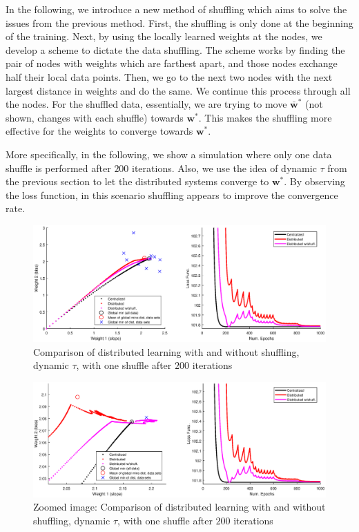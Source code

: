 \documentclass[11pt, fullpage,letterpaper]{article}
\begin{document}
\begin{enumerate}
\begin{enumerate}
   In the following, we introduce a new method of shuffling which aims to solve the issues from the previous method. First, the shuffling is only done at the beginning of the training. Next, by using the locally learned weights at the nodes, we develop a scheme to dictate the data shuffling. The scheme works by finding the pair of nodes with weights which are farthest apart, and those nodes exchange half their local data points. Then, we go to the next two nodes with the next largest distance in weights and do the same. We continue this process through all the nodes. For the shuffled data, essentially, we are trying to move $\bar{\boldsymbol{w}}^*$ (not shown, changes with each shuffle) towards $\boldsymbol{w}^*$. This makes the shuffling more effective for the weights to converge towards $\boldsymbol{w}^*$.

   More specifically, in the following, we show a simulation where only one data shuffle is performed after $200$ iterations. Also, we use the idea of dynamic $\tau$ from the previous section to let the distributed systems converge to $\boldsymbol{w}^*$. By observing the loss function, in this scenario shuffling appears to improve the convergence rate.


            \begin{figure}[H]
\begin{center}
\advance\leftskip-3cm
\advance\rightskip-3cm
\includegraphics[width=20cm]{shuff2.eps}
\caption{Comparison of distributed learning with and without shuffling, dynamic $\tau$, with one shuffle after $200$ iterations}
\end{center}\end{figure}

   \begin{figure}[H]
\begin{center}
\advance\leftskip-3cm
\advance\rightskip-3cm
\includegraphics[width=20cm]{shuff2_zoom.eps}
\caption{Zoomed image: Comparison of distributed learning with and without shuffling, dynamic $\tau$, with one shuffle after $200$ iterations}
\end{center}\end{figure}


\end{enumerate}
\end{enumerate}
\end{document}
